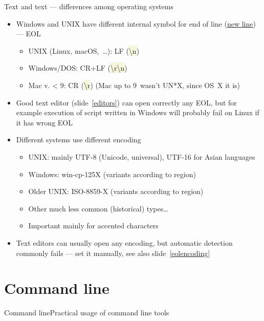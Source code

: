 \documentclass[compress, xelatex, 11pt, xcolor=svgnames, aspectratio=169, url={hyphens, lowtilde}]{beamer}
\renewcommand{\texttt}[1]{\colorbox{Beige}{{\ttfamily #1}}}
\begin{document}
\begin{frame}{Text and text --- differences among operating systems}
	\label{eolenc}
	\begin{itemize}
		\item Windows and UNIX have different internal symbol for end of line (\href{https://en.wikipedia.org/wiki/Newline}{new line}) --- EOL
		\begin{itemize}
			\item UNIX (Linux, macOS,~\ldots): LF (\texttt{\textbackslash n})
			\item Windows/DOS: CR+LF (\texttt{\textbackslash r\textbackslash n})
			\item Mac v. < 9: CR (\texttt{\textbackslash r}) (Mac up to 9~wasn't UN*X, since OS~X it is)
		\end{itemize}
		\item Good text editor (slide~\ref{editors}) can open correctly any EOL, but for example execution of script written in Windows will probably fail on Linux if it has wrong EOL
		\item Different systems use different encoding
		\begin{itemize}
			\item UNIX: mainly UTF-8 (Unicode, universal), UTF-16 for Asian languages
			\item Windows: win-cp-125X (variants according to region)
			\item Older UNIX: ISO-8859-X (variants according to region)
			\item Other much less common (historical) types\ldots
			\item Important mainly for accented characters
		\end{itemize}
		\item Text editors can usually open any encoding, but automatic detection commonly fails --- set it manually, see also slide~\ref{eolencoding}
	\end{itemize}
\end{frame}

\section{Command line}

\begin{frame}[allowframebreaks]{Command line}{Practical usage of command line tools}
	\tableofcontents[currentsection, sectionstyle=show/hide, hideothersubsections]
\end{frame}
\end{document}
